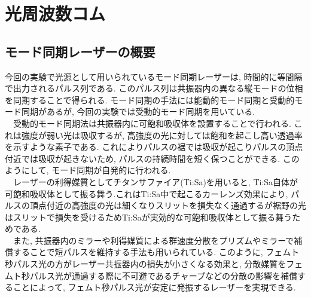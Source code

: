 \documentclass[uplatex, dvipdfmx, a4paper, report, papersize, 11pt]{jsbook}
\begin{document}
\newpage
\section{光周波数コム}
\subsection{モード同期レーザーの概要}
今回の実験で光源として用いられているモード同期レーザーは, 時間的に等間隔で出力されるパルス列である. このパルス列は共振器内の異なる縦モードの位相を同期することで得られる. モード同期の手法には能動的モード同期と受動的モード同期があるが, 今回の実験では受動的モード同期を用いている.\\
　受動的モード同期法は共振器内に可飽和吸収体を設置することで行われる. これは強度が弱い光は吸収するが, 高強度の光に対しては飽和を起こし高い透過率を示すような素子である. これによりパルスの裾では吸収が起こりパルスの頂点付近では吸収が起きないため, パルスの持続時間を短く保つことができる. このようにして, モード同期が自発的に行われる.\\
　レーザーの利得媒質としてチタンサファイア(Ti:Sa)を用いると, Ti:Sa自体が可飽和吸収体として振る舞う.これはTi:Sa中で起こるカーレンズ効果により, パルスの頂点付近の高強度の光は細くなりスリットを損失なく通過するが裾野の光はスリットで損失を受けるためTi:Saが実効的な可飽和吸収体として振る舞うためである.\\
　また, 共振器内のミラーや利得媒質による群速度分散をプリズムやミラーで補償することで短パルスを維持する手法も用いられている. このように, フェムト秒パルス光の方がレーザー共振器内の損失が小さくなる効果と, 分散媒質をフェムト秒パルス光が通過する際に不可避であるチャープなどの分散の影響を補償することによって, フェムト秒パルス光が安定に発振するレーザーを実現できる.
\end{document}
